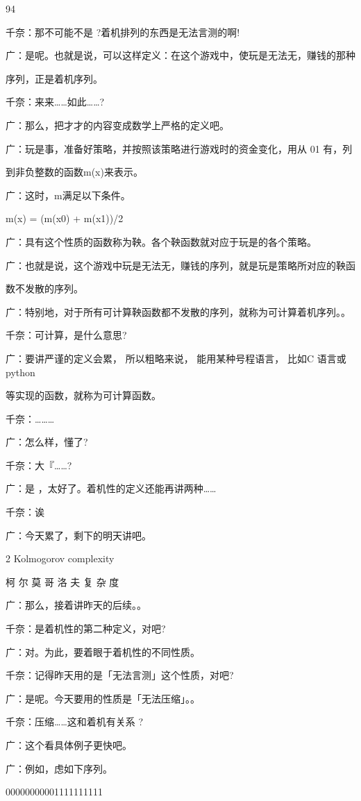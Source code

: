 94\par
千奈：那不可能不是 ?着机排列的东西是无法言测的啊!\par
广：是呢。也就是说，可以这样定义：在这个游戏中，使玩是无法无，赚钱的那种\par
序列，正是着机序列。\par
千奈：来来……如此……?\par
广：那么，把才才的内容变成数学上严格的定义吧。\par
广：玩是事，准备好策略，并按照该策略进行游戏时的资金变化，用从 01 有，列\par
到非负整数的函数m(x)来表示。\par
广：这时，m满足以下条件。\par
m(x) = (m(x0) + m(x1))/2\par
广：具有这个性质的函数称为鞅。各个鞅函数就对应于玩是的各个策略。\par
广：也就是说，这个游戏中玩是无法无，赚钱的序列，就是玩是策略所对应的鞅函\par
数不发散的序列。\par
广：特别地，对于所有可计算鞅函数都不发散的序列，就称为可计算着机序列。。\par
千奈：可计算，是什么意思?\par
广：要讲严谨的定义会累， 所以粗略来说， 能用某种号程语言， 比如C 语言或 python\par
等实现的函数，就称为可计算函数。\par
千奈：………\par
广：怎么样，懂了?\par
千奈：大『……?\par
广：是 ，太好了。着机性的定义还能再讲两种……\par
千奈：诶\par
广：今天累了，剩下的明天讲吧。\par
2 Kolmogorov complexity\par
柯 尔 莫 哥 洛 夫 复 杂 度\par
广：那么，接着讲昨天的后续。。\par
千奈：是着机性的第二种定义，对吧?\par
广：对。为此，要着眼于着机性的不同性质。\par
千奈：记得昨天用的是「无法言测」这个性质，对吧?\par
广：是呢。今天要用的性质是「无法压缩」。。\par
千奈：压缩……这和着机有关系 ?\par
广：这个看具体例子更快吧。\par
广：例如，虑如下序列。\par
00000000001111111111\par

